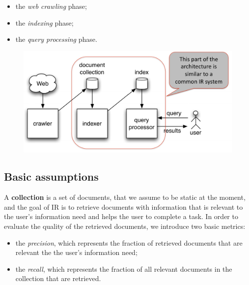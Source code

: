 \begin{itemize}
    \item the \textit{web crawling} phase;
    \item the \textit{indexing} phase;
    \item the \textit{query processing} phase.
\end{itemize}

\begin{figure}[h!]
		\centering
		\includegraphics[scale = 0.6]{img/web search engine.jpg}
		\label{web_search}
\end{figure}

\subsection{Basic assumptions}
A \textbf{collection} is a set of documents, that we assume to be static at the moment, and the goal of IR is to retrieve documents with information that is relevant to the user's information need and helps the user to complete a task. In order to evaluate the quality of the retrieved documents, we introduce two basic metrics:

\begin{itemize}
    \item the \textit{precision}, which represents the fraction of retrieved documents that are relevant the the user's information need;
    \item the \textit{recall}, which represents the fraction of all relevant documents in the collection that are retrieved.
\end{itemize}

